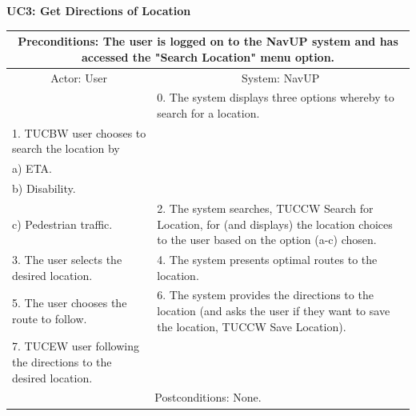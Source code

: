 \documentclass{article}
\begin{document}
		 \vspace{5mm}
         \begin{flushleft}
         \textbf{UC3: Get Directions of Location}\\
         \end{flushleft}
        	\centering		
       		 \small
       		 \begin{tabular}{|p{8cm}|p{8cm}|}
       		 \hline
       		 \multicolumn{2}{c}{Preconditions: The user is logged on to the NavUP system and has accessed the "Search Location" menu option.}\\
       		 \hline
       		 \multicolumn{1}{c}{Actor: User} & \multicolumn{1}{c}{ System: NavUP} \\
        		\hline
       		 & 0.	The system displays three options whereby to search for a location.\\
       		 \hline
       		 1.	TUCBW user chooses to search the location by 

						\\a)	ETA.
						\\b)	Disability.
						\\c)	Pedestrian traffic.
 & 2.	The system searches, TUCCW Search for Location, for (and displays) the location choices to the user based on the option (a-c) chosen. \\
        		\hline
       		 3.	The user selects the desired location. & 4.	The system presents optimal routes to the location. \\
        		\hline
       		 5.	The user chooses the route to follow. & 6.	The system provides the directions to the location (and asks the user if they want to save the location, TUCCW Save Location).\\
        		\hline
        		7.	TUCEW user following the directions to the desired location. & \\
       		 \hline
        		\multicolumn{2}{c}{Postconditions: None.} \\
        		\hline
        \end{tabular} 
        
\end{document}
